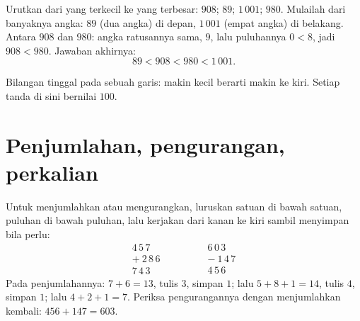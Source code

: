 \begin{example}\label{ex:g6:wholes:order}
Urutkan dari yang terkecil ke yang terbesar: $908$; $89$; $1\,001$;
$980$. Mulailah dari banyaknya angka: $89$ (dua angka) di depan,
$1\,001$ (empat angka) di belakang. Antara $908$ dan $980$: angka
ratusannya sama, $9$, lalu puluhannya $0 < 8$, jadi $908 < 980$.
Jawaban akhirnya:
\[
89 < 908 < 980 < 1\,001 .
\]
\end{example}

\begin{omfigure}

{\small Bilangan tinggal pada sebuah garis: makin kecil berarti makin
ke kiri. Setiap tanda di sini bernilai $100$.}
\end{omfigure}

\section{Penjumlahan, pengurangan, perkalian}

\begin{example}\label{ex:g6:wholes:columns}
Untuk menjumlahkan atau mengurangkan, luruskan satuan di bawah satuan,
puluhan di bawah puluhan, lalu kerjakan dari kanan ke kiri sambil
menyimpan bila perlu:
\[
\begin{array}{r}
4\,5\,7 \\
+\ 2\,8\,6 \\
\hline
7\,4\,3
\end{array}
\qquad\qquad
\begin{array}{r}
6\,0\,3 \\
-\ 1\,4\,7 \\
\hline
4\,5\,6
\end{array}
\]
Pada penjumlahannya: $7 + 6 = 13$, tulis $3$, simpan $1$; lalu
$5 + 8 + 1 = 14$, tulis $4$, simpan $1$; lalu $4 + 2 + 1 = 7$.
Periksa pengurangannya dengan menjumlahkan kembali: $456 + 147 = 603$.
\end{example}

